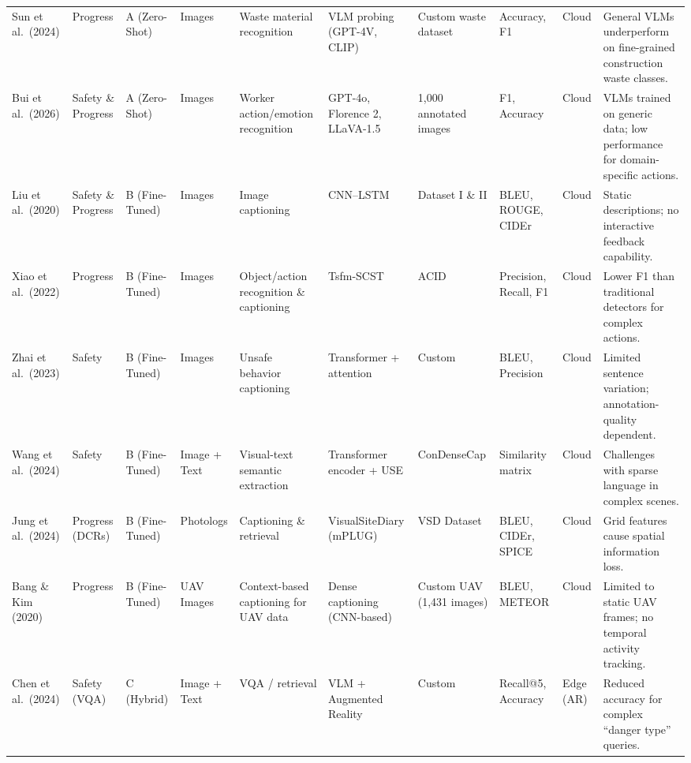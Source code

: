 \documentclass[10pt,letterpaper]{article}
\begin{document}
\begin{landscape}
\begin{longtable}{L{2.8cm} L{1.7cm} L{2.0cm} L{2.5cm} L{1.5cm} L{3.0cm} L{1.8cm} L{2.0cm} L{1.6cm} L{3.2cm}}
Sun et al.\ (2024) & Progress & A (Zero-Shot) & Images & Waste material recognition & VLM probing (GPT-4V, CLIP) & Custom waste dataset & Accuracy, F1 & Cloud & General VLMs underperform on fine-grained construction waste classes.\\

Bui et al.\ (2026) & Safety \& Progress & A (Zero-Shot) & Images & Worker action/emotion recognition & GPT-4o, Florence 2, LLaVA-1.5 & 1,000 annotated images & F1, Accuracy & Cloud & VLMs trained on generic data; low performance for domain-specific actions.\\

Liu et al.\ (2020) & Safety \& Progress & B (Fine-Tuned) & Images & Image captioning & CNN--LSTM & Dataset I \& II & BLEU, ROUGE, CIDEr & Cloud & Static descriptions; no interactive feedback capability.\\

Xiao et al.\ (2022) & Progress & B (Fine-Tuned) & Images & Object/action recognition \& captioning & Tsfm-SCST & ACID & Precision, Recall, F1 & Cloud & Lower F1 than traditional detectors for complex actions.\\

Zhai et al.\ (2023) & Safety & B (Fine-Tuned) & Images & Unsafe behavior captioning & Transformer + attention & Custom & BLEU, Precision & Cloud & Limited sentence variation; annotation-quality dependent.\\

Wang et al.\ (2024) & Safety & B (Fine-Tuned) & Image + Text & Visual-text semantic extraction & Transformer encoder + USE & ConDenseCap & Similarity matrix & Cloud & Challenges with sparse language in complex scenes.\\

Jung et al.\ (2024) & Progress (DCRs) & B (Fine-Tuned) & Photologs & Captioning \& retrieval & VisualSiteDiary (mPLUG) & VSD Dataset & BLEU, CIDEr, SPICE & Cloud & Grid features cause spatial information loss.\\

Bang \& Kim (2020) & Progress & B (Fine-Tuned) & UAV Images & Context-based captioning for UAV data & Dense captioning (CNN-based) & Custom UAV (1,431 images) & BLEU, METEOR & Cloud & Limited to static UAV frames; no temporal activity tracking.\\

Chen et al.\ (2024) & Safety (VQA) & C (Hybrid) & Image + Text & VQA / retrieval & VLM + Augmented Reality & Custom & Recall@5, Accuracy & Edge (AR) & Reduced accuracy for complex ``danger type'' queries.\\


\end{longtable}
\end{landscape}
\end{document}
